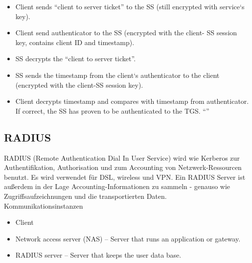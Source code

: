 \documentclass{article} %
\begin{document}
\begin{enumerate}
		\begin{itemize}
		\item Client sends "`client to server ticket"' to the SS (still encrypted 
		with service‘s key). 
		\item Client send authenticator to the SS (encrypted with the client-
		SS session key, contains client ID and timestamp). 
		\item SS decrypts the "`client to server ticket"'. 
		\item SS sends the timestamp from the client‘s authenticator to the 
		client (encrypted with the client-SS session key). 
		\item Client decrypts timestamp and compares with timestamp from 
		authenticator. If correct, the SS has proven to be authenticated 
		to the TGS. 
		"`"'
		
		\end{itemize}
	\end{enumerate}
	
\subsection{RADIUS}
RADIUS (Remote Authentication Dial In User Service) wird wie Kerberos zur Authentifikation, Authorisation und zum Accounting von Netzwerk-Ressourcen benutzt. Es wird verwendet für DSL, wireless und VPN. Ein RADIUS Server ist außerdem in der Lage Accounting-Informationen zu sammeln - genauso wie Zugriffsaufzeichnungen und die transportierten Daten.\\

\noindent Kommunikationsinstanzen
	\begin{itemize}
	\item Client
	\item Network access server (NAS) – Server that runs an application or gateway. 
	\item RADIUS server – Server that keeps the user data base. 
	\end{itemize}
	
\end{document}
